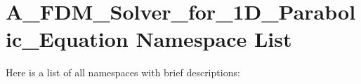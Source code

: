 \section{A\_\-FDM\_\-Solver\_\-for\_\-1D\_\-Parabolic\_\-Equation Namespace List}
Here is a list of all namespaces with brief descriptions:\begin{CompactList}
\item{}
\end{CompactList}
